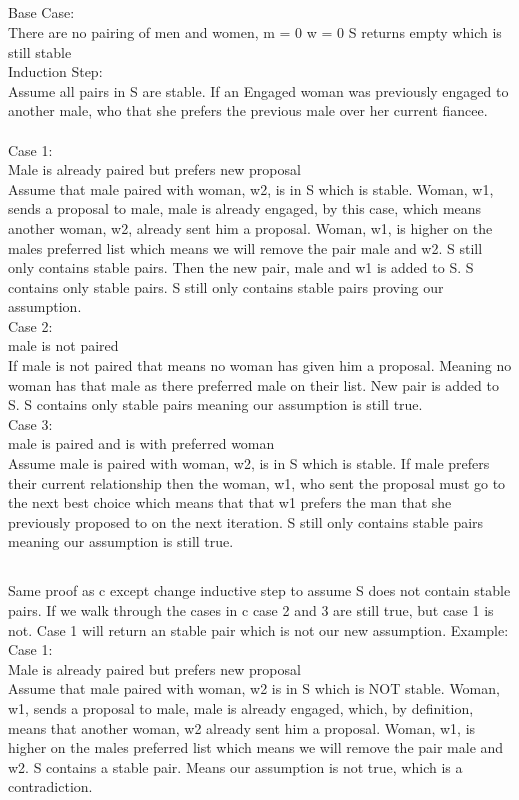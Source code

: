 \documentclass[letterpaper]{article}
\begin{document}
		\subsection{}
      		Base Case:  \\There are no pairing of men and women, m = 0 w = 0 S returns empty which is still stable\\
            Induction Step:  \\Assume all pairs in S are stable.  If
            an Engaged woman was previously engaged to another male, who that she prefers the previous male over her current fiancee.\\
            \\
            Case 1: \\Male is already paired but prefers new proposal\\
            Assume that male paired with woman, w2, is in S which is stable.
            Woman, w1, sends a proposal to male, male is already engaged, by this case, which means another woman, w2, already sent him a proposal.  Woman, w1, is higher on the males preferred list which means we will remove the pair male and w2.  S still only contains stable pairs.  Then the new pair, male and w1 is added to S.  S contains only stable pairs.  S still only contains stable pairs proving our assumption.\\
            Case 2: \\male is not paired\\
            If male is not paired that means no woman has given him a proposal.  Meaning no woman has that male as there preferred male on their list.  New pair is added to S.  S contains only stable pairs meaning our assumption is still true.\\
            Case 3: \\male is paired and is with preferred woman\\
            Assume male is paired with woman, w2, is in S which is stable.
            If male prefers their current relationship then the woman, w1, who sent the proposal must go to the next best choice which means that that w1 prefers the man that she previously proposed to on the next iteration.  S still only contains stable pairs meaning our assumption is still true.
		\subsection{}
        	Same proof as c except change inductive step to assume S does not contain stable pairs.  If we walk through the cases in c case 2 and 3 are still true, but case 1 is not.  Case 1 will return an stable pair which is not our new assumption.  Example:\\
            Case 1: \\Male is already paired but prefers new proposal\\
            Assume that male paired with woman, w2 is in S which is NOT stable.  Woman, w1, sends a proposal to male, male is already engaged, which, by definition, means that another woman, w2 already sent him a proposal.  Woman, w1, is higher on the males preferred list which means we will remove the pair male and w2.  S contains a stable pair.  Means our assumption is not true, which is a contradiction.  
\end{document}
